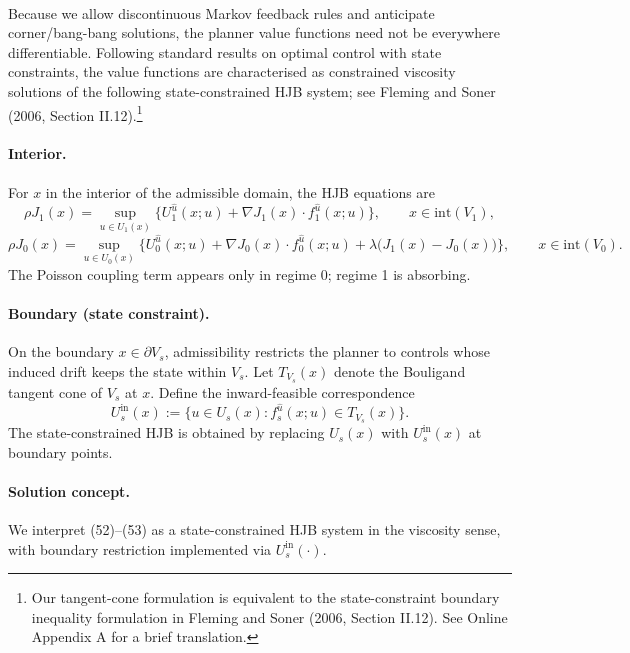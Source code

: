 \documentclass{article}
\begin{document}
\paragraph{}

Because we allow discontinuous Markov feedback rules and anticipate corner/bang-bang solutions, the planner value functions
need not be everywhere differentiable. Following standard results on optimal control with state constraints, the value functions
are characterised as constrained viscosity solutions of the following state-constrained HJB system; see Fleming and Soner (2006,
Section II.12).\footnote{Our tangent-cone formulation is equivalent to the state-constraint boundary inequality formulation in
Fleming and Soner (2006, Section II.12). See Online Appendix A for a brief translation.}

\paragraph{Interior.}
For $x$ in the interior of the admissible domain, the HJB equations are
\[
\rho J_1(x)=\sup_{u\in U_1(x)}\Big\{U_1^{\hat u}(x;u)+\nabla J_1(x)\cdot f_1^{\hat u}(x;u)\Big\},
\qquad x\in \mathrm{int}(V_1),
\tag{52}
\]
\[
\rho J_0(x)=\sup_{u\in U_0(x)}\Big\{U_0^{\hat u}(x;u)+\nabla J_0(x)\cdot f_0^{\hat u}(x;u)+\lambda\big(J_1(x)-J_0(x)\big)\Big\},
\qquad x\in \mathrm{int}(V_0).
\tag{53}
\]
The Poisson coupling term appears only in regime 0; regime 1 is absorbing.

\paragraph{Boundary (state constraint).}
On the boundary $x\in\partial V_s$, admissibility restricts the planner to controls whose induced drift keeps the state within
$V_s$. Let $T_{V_s}(x)$ denote the Bouligand tangent cone of $V_s$ at $x$. Define the inward-feasible correspondence
\[
U^{\mathrm{in}}_s(x):=\big\{u\in U_s(x): f_s^{\hat u}(x;u)\in T_{V_s}(x)\big\}.
\]
The state-constrained HJB is obtained by replacing $U_s(x)$ with $U^{\mathrm{in}}_s(x)$ at boundary points.

\paragraph{Solution concept.}
We interpret (52)–(53) as a state-constrained HJB system in the viscosity sense, with boundary restriction implemented via
$U^{\mathrm{in}}_s(\cdot)$.
\end{document}
